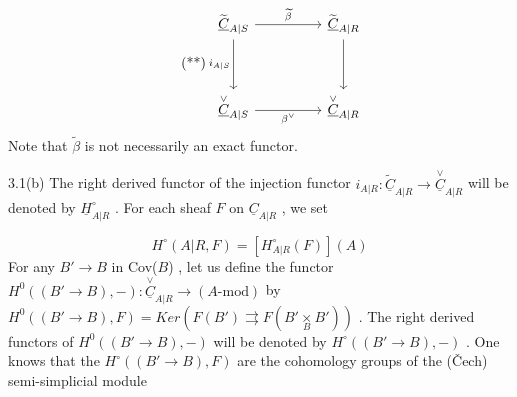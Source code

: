 \begin{equation}\tag{**}
\begin{tikzcd}[column sep=huge, row sep=huge]
\widetilde{\underline{C}}_{A|S} \arrow[r, "\widetilde{\beta}"] \arrow[d, "i_{A|S}"'] & \widetilde{\underline{C}}_{A|R} \arrow[d] \\
\overset{\vee}{\underline{C}}_{A|S} \arrow[r, "\beta^{\vee}"'] & \overset{\vee}{\underline{C}}_{A|R}
\end{tikzcd}
\end{equation}
Note that  $\widetilde{\beta}$  is not necessarily an exact functor.

3.1(b)  The right derived functor of the injection functor  $i_{A|R}: \widetilde{\underline{C}}_{A|R} \to \overset{\vee}{\underline{C}}_{A|R}$  will be denoted by  $\underline{H}^{\circ}_{A|R}$ . For each sheaf  $F$  on  $\underline{C}_{A|R}$ , we set

\begin{equation*}
H^{\circ}(A|R,F) = [H^{\circ}_{A|R}(F)](A)
\end{equation*}
For any  $B' \to B$  in  Cov($B$) , let us define the functor  $H^{0}((B' \to B),-) : \overset{\vee}{\underline{C}}_{A|R} \to (A\text{-mod})$  by  $H^{0}((B'\to B),F) = Ker(F(B') \rightrightarrows F(B'\underset{B}{\times} B'))$ . The right derived functors of  $H^{0}((B' \to B),-)$  will be denoted by  $H^{\circ}((B'\to B),-)$ . One knows that the  $H^{\circ}((B' \to B),F)$  are the cohomology groups of the (Čech)
semi-simplicial module

